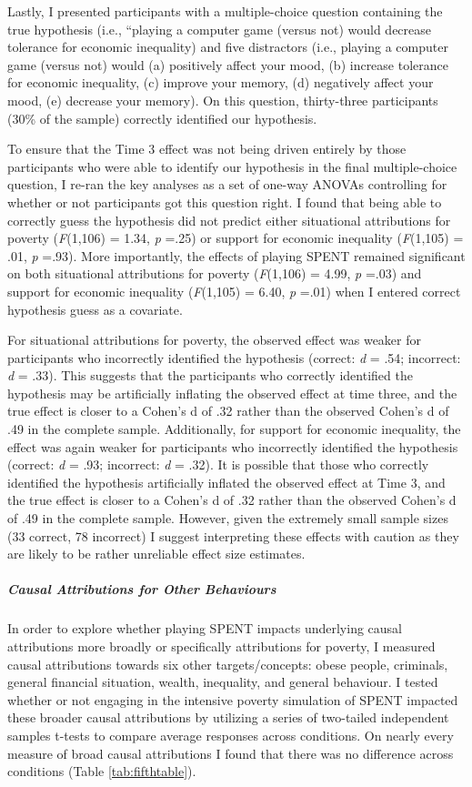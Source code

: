 \documentclass{sfuthesis}
\begin{document}
Lastly, I presented participants with a multiple-choice question containing the true hypothesis (i.e., “playing a computer game (versus not) would decrease tolerance for economic inequality) and five distractors (i.e., playing a computer game (versus not) would (a) positively affect your mood, (b) increase tolerance for economic inequality, (c) improve your memory, (d) negatively affect your mood, (e) decrease your memory). On this question, thirty-three participants (30\% of the sample) correctly identified our hypothesis.

To ensure that the Time 3 effect was not being driven entirely by those participants who were able to identify our hypothesis in the final multiple-choice question, I re-ran the key analyses as a set of one-way ANOVAs controlling for whether or not participants got this question right. I found that being able to correctly guess the hypothesis did not predict either situational attributions for poverty (\textit{F}(1,106) = 1.34, \textit{p} =.25) or support for economic inequality (\textit{F}(1,105) = .01, \textit{p} =.93). More importantly, the effects of playing SPENT remained significant on both situational attributions for poverty (\textit{F}(1,106) = 4.99, \textit{p} =.03) and support for economic inequality (\textit{F}(1,105) = 6.40, \textit{p} =.01) when I entered correct hypothesis guess as a covariate.

For situational attributions for poverty, the observed effect was weaker for participants who incorrectly identified the hypothesis (correct: \textit{d} = .54; incorrect: \textit{d} = .33). This suggests that the participants who correctly identified the hypothesis may be artificially inflating the observed effect at time three, and the true effect is closer to a Cohen’s d of .32 rather than the observed Cohen’s d of .49 in the complete sample. Additionally, for support for economic inequality, the effect was again weaker for participants who incorrectly identified the hypothesis (correct: \textit{d} = .93; incorrect: \textit{d} = .32). It is possible that those who correctly identified the hypothesis artificially inflated the observed effect at Time 3, and the true effect is closer to a Cohen’s d of .32 rather than the observed Cohen’s d of .49 in the complete sample. However, given the extremely small sample sizes (33 correct, 78 incorrect) I suggest interpreting these effects with caution as they are likely to be rather unreliable effect size estimates.

\subparagraph{Causal Attributions for Other Behaviours} In order to explore whether playing SPENT impacts underlying causal attributions more broadly or specifically attributions for poverty, I measured causal attributions towards six other targets/concepts: obese people, criminals, general financial situation, wealth, inequality, and general behaviour. I tested whether or not engaging in the intensive poverty simulation of SPENT impacted these broader causal attributions by utilizing a series of two-tailed independent samples t-tests to compare average responses across conditions. On nearly every measure of broad causal attributions I found that there was no difference across conditions (Table \ref{tab:fifthtable}).
\end{document}
